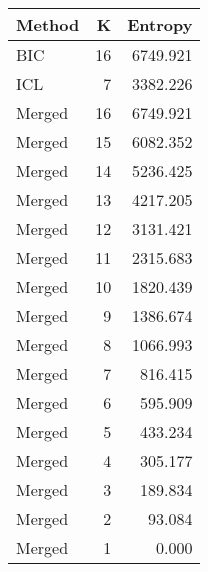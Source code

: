 \begin{center} 
\begin{tabular}{lrr}
 Method & K & Entropy \\ 
  \hline
\hline
BIC &   16 & 6749.921 \\ 
  ICL &    7 & 3382.226 \\ 
  Merged &   16 & 6749.921 \\ 
  Merged &   15 & 6082.352 \\ 
  Merged &   14 & 5236.425 \\ 
  Merged &   13 & 4217.205 \\ 
  Merged &   12 & 3131.421 \\ 
  Merged &   11 & 2315.683 \\ 
  Merged &   10 & 1820.439 \\ 
  Merged &    9 & 1386.674 \\ 
  Merged &    8 & 1066.993 \\ 
  Merged &    7 & 816.415 \\ 
  Merged &    6 & 595.909 \\ 
  Merged &    5 & 433.234 \\ 
  Merged &    4 & 305.177 \\ 
  Merged &    3 & 189.834 \\ 
  Merged &    2 & 93.084 \\ 
  Merged &    1 & 0.000 \\ 
  \end{tabular}
\end{center} 
